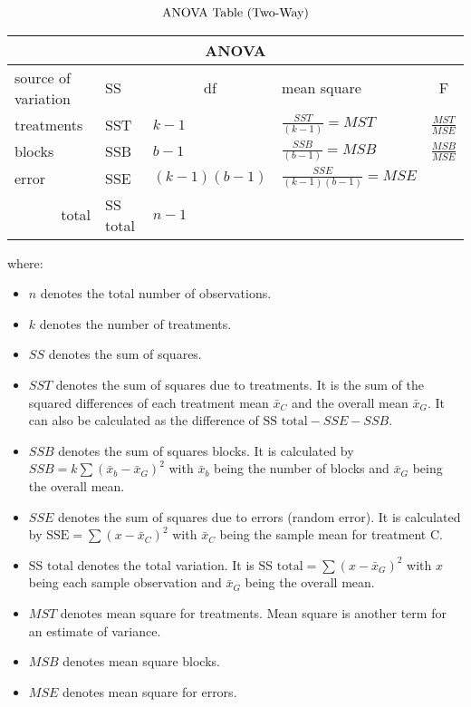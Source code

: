 \\
\begin{equation}
\label{anova table two-way}
\centering \text{ANOVA Table (Two-Way)}
\end{equation}
\begin{table}[!h] %
 \begin{footnotesize} %
 \begin{tabular}{@{}lllll@{}}
 \toprule
 \multicolumn{5}{c}{ANOVA} \\
 \midrule
 source of variation & \multicolumn{1}{l}{SS} & \multicolumn{1}{c}{df} & \multicolumn{1}{l}{mean square} & \multicolumn{1}{c}{F} \\
 \midrule
 treatments & SST & $k-1$ & $\frac{SST}{(k-1)}=MST$ & $\frac{MST}{MSE}$ \\
 blocks & SSB & $b-1$ & $\frac{SSB}{(b-1)}=MSB$ & $\frac{MSB}{MSE}$ \\
 error & SSE & $(k-1)(b-1)$ & $\frac{SSE}{(k-1)(b-1)} = MSE$ &  \\
 \multicolumn{1}{r}{total} & SS total  & $n - 1$ &  & 
 \end{tabular}
 \end{footnotesize}
\end{table}

where:
\begin{itemize}
 \item $n$ denotes the total number of observations.
 \item $k$ denotes the number of treatments.
 \item $SS$ denotes the sum of squares.
 \item $SST$ denotes the sum of squares due to treatments. It is the sum of the squared differences of each treatment mean $\bar{x}_C$ and the overall mean $\bar{x}_G$. It can also be calculated as the difference of $\text{SS total} - SSE - SSB$.
 \item $SSB$ denotes the sum of squares blocks. It is calculated by ${SSB} = k\sum(\bar{x}_{b}-\bar{x}_{G})^{2}$ with $\bar{x}_b$ being the number of blocks and $\bar{x}_G$ being the overall mean.
 \item $SSE$ denotes the sum of squares due to errors (random error). It is calculated by $\text{SSE} = \sum{(x-\bar{x}_C)^2}$ with $\bar{x}_C$ being the sample mean for treatment C.
 \item $\text{SS total}$ denotes the total variation. It is $\text{SS total} = \sum{(x-\bar{x}_{G})^{2}}$ with $x$ being each sample observation and $\bar{x}_G$ being the overall mean.
 \item $MST$ denotes mean square for treatments. Mean square is another term for an estimate of variance.
  \item $MSB$ denotes mean square blocks.
 \item $MSE$ denotes mean square for errors.
\end{itemize}

